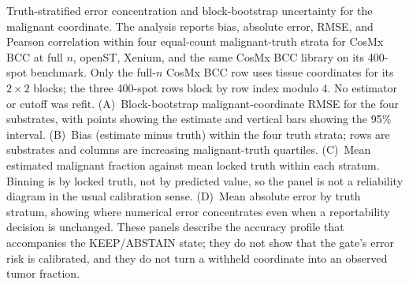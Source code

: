 Truth-stratified error concentration and block-bootstrap uncertainty for the malignant coordinate. The analysis reports bias, absolute error, RMSE, and Pearson correlation within four equal-count malignant-truth strata for CosMx BCC at full \(n\), openST, Xenium, and the same CosMx BCC library on its 400-spot benchmark. Only the full-\(n\) CosMx BCC row uses tissue coordinates for its \(2\times2\) blocks; the three 400-spot rows block by row index modulo 4. No estimator or cutoff was refit. (A)~Block-bootstrap malignant-coordinate RMSE for the four substrates, with points showing the estimate and vertical bars showing the 95\% interval. (B)~Bias (estimate minus truth) within the four truth strata; rows are substrates and columns are increasing malignant-truth quartiles. (C)~Mean estimated malignant fraction against mean locked truth within each stratum. Binning is by locked truth, not by predicted value, so the panel is not a reliability diagram in the usual calibration sense. (D)~Mean absolute error by truth stratum, showing where numerical error concentrates even when a reportability decision is unchanged. These panels describe the accuracy profile that accompanies the KEEP/ABSTAIN state; they do not show that the gate's error risk is calibrated, and they do not turn a withheld coordinate into an observed tumor fraction.